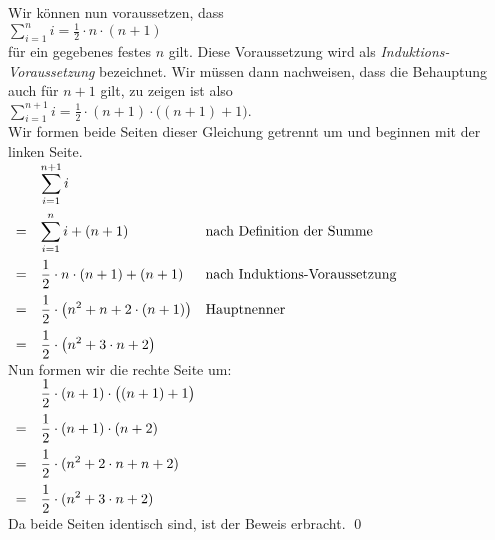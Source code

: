\begin{enumerate}
      Wir k\"{o}nnen nun voraussetzen, dass
      \\[0.2cm]
      \hspace*{1.3cm}
      $\sum\limits_{i=1}^n i = \frac{1}{2} \cdot n \cdot (n+1)$
      \\[0.2cm]
      f\"{u}r ein gegebenes festes $n$ gilt.  Diese Voraussetzung wird als \emph{Induktions-Voraussetzung}
      bezeichnet.  Wir m\"{u}ssen dann nachweisen, dass  die Behauptung auch
      f\"{u}r $n+1$ gilt, zu zeigen ist also 
      \\[0.2cm]
      \hspace*{1.3cm}
      $\sum\limits_{i=1}^{n+1} i = \frac{1}{2} \cdot (n+1) \cdot \bigl((n+1)+1\bigr)$.
      \\[0.2cm]
      Wir formen beide Seiten dieser Gleichung getrennt um und beginnen mit der linken Seite.
      \\[0.2cm]
      \hspace*{1.3cm}
      $
      \begin{array}[t]{cll}
        &\displaystyle \sum\limits_{i=1}^{n+1} i                                                       \\[0.5cm]
      = &\displaystyle \sum\limits_{i=1}^{n} i + (n+1)          & \mbox{nach Definition der Summe}     \\[0.5cm]
      = &\displaystyle \frac{1}{2} \cdot n \cdot (n+1) + (n+1)  & \mbox{nach Induktions-Voraussetzung} \\[0.3cm]
      = &\displaystyle \frac{1}{2} \cdot \bigl( n^2 + n  + 2 \cdot(n+1)\bigr)  & \mbox{Hauptnenner} \\[0.3cm]
      = &\displaystyle \frac{1}{2} \cdot \bigl( n^2 + 3 \cdot n  + 2 \bigr)  
      \end{array}
      $
      \\[0.2cm]
      Nun formen wir die rechte Seite um:
      \\[0.2cm]
      \hspace*{1.3cm}
      $
      \begin{array}[t]{cl}
         &\displaystyle \frac{1}{2} \cdot (n+1) \cdot \bigl((n+1)+1\bigr) \\[0.3cm]
       = &\displaystyle \frac{1}{2} \cdot (n+1) \cdot (n+2)               \\[0.3cm]
       = & \displaystyle \frac{1}{2} \cdot (n^2  + 2 \cdot n + n + 2)     \\[0.3cm]
       = &\displaystyle \frac{1}{2} \cdot (n^2  + 3 \cdot n + 2)  
      \end{array}
      $
      \\[0.2cm]
      Da beide Seiten identisch sind, ist der Beweis erbracht. \qed
\end{enumerate}


